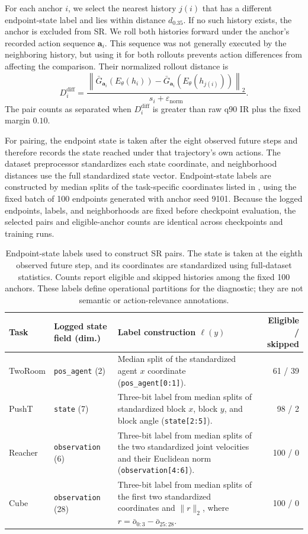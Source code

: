 \documentclass{article}
\newcommand{\code}[1]{\texttt{#1}}
\begin{document}
For each anchor $i$, we select the nearest history $j(i)$ that has a different
endpoint-state label and lies within distance $d_{0.35}$. If no such history
exists, the anchor is excluded from SR. We roll both histories forward under
the anchor's recorded action sequence $\mathbf a_i$. This sequence was not
generally executed by the neighboring history, but using it for both rollouts
prevents action differences from affecting the comparison. Their normalized
rollout distance is
\begin{equation}
D_i^{\mathrm{diff}}
=
\frac{
\left\|\bar G_{\mathbf a_i}(E_\theta(h_i))
-\bar G_{\mathbf a_i}(E_\theta(h_{j(i)}))\right\|_2
}{s_i+\varepsilon_{\mathrm{norm}}}.
\end{equation}
The pair counts as separated when $D_i^{\mathrm{diff}}$ is greater than raw
q90 IR plus the fixed margin $0.10$.

For pairing, the endpoint state is taken after the eight observed future steps
and therefore records the state reached under that trajectory's own actions.
The dataset preprocessor standardizes each state coordinate, and neighborhood
distances use the full standardized state vector. Endpoint-state labels are
constructed by median splits of the task-specific coordinates listed in
, using the fixed batch of 100 endpoints generated with
anchor seed 9101. Because the logged endpoints, labels, and neighborhoods are
fixed before checkpoint evaluation, the selected pairs and eligible-anchor
counts are identical across checkpoints and training runs.

\begin{table}[H]
\centering
\caption{Endpoint-state labels used to construct SR pairs. The state is taken
at the eighth observed future step, and its coordinates are standardized using
full-dataset statistics. Counts report eligible and skipped histories among
the fixed 100 anchors. These labels define operational partitions for the
diagnostic; they are not semantic or action-relevance annotations.}
\label{tab:sr-labels}
\footnotesize
\setlength{\tabcolsep}{3pt}
\begin{tabularx}{\linewidth}{l l X r}
\toprule
Task & Logged state field (dim.) & Label construction $\ell(y)$ & Eligible / skipped \\
\midrule
TwoRoom & \code{pos\_agent} (2) & Median split of the standardized agent $x$ coordinate (\code{pos\_agent[0:1]}). & 61 / 39 \\
PushT & \code{state} (7) & Three-bit label from median splits of standardized block $x$, block $y$, and block angle (\code{state[2:5]}). & 98 / 2 \\
Reacher & \code{observation} (6) & Three-bit label from median splits of the two standardized joint velocities and their Euclidean norm (\code{observation[4:6]}). & 100 / 0 \\
Cube & \code{observation} (28) & Three-bit label from median splits of the first two standardized coordinates and $\|r\|_2$, where $r=\bar o_{0:3}-\bar o_{25:28}$. & 100 / 0 \\
\bottomrule
\end{tabularx}
\end{table}
\end{document}
